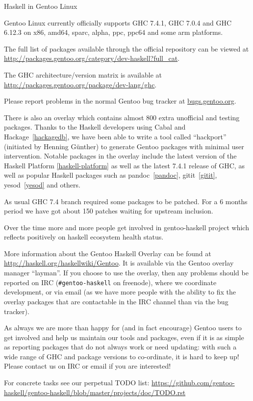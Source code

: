 \begin{hcarentry}[updated]{Haskell in Gentoo Linux}
\label{gentoo}
\makeheader

Gentoo Linux currently officially supports GHC 7.4.1, GHC 7.0.4 and GHC 6.12.3
on x86, amd64, sparc, alpha, ppc, ppc64 and some arm platforms.

The full list of packages available through the official repository
can be viewed at
\url{http://packages.gentoo.org/category/dev-haskell?full\_cat}.

The GHC architecture/version matrix is available at
\url{http://packages.gentoo.org/package/dev-lang/ghc}.

Please report problems in the normal Gentoo bug tracker
at \url{bugs.gentoo.org}.

There is also an overlay which contains almost 800 extra unofficial
and testing packages. Thanks to the Haskell developers using Cabal and
Hackage~\cref{hackagedb}, we have been able to write a tool called
``hackport'' (initiated by Henning G\"unther) to generate Gentoo
packages with minimal user intervention. Notable packages in the
overlay include the latest version of the Haskell Platform \cref{haskell-platform} as well as
the latest 7.4.1 release of GHC, as well as popular Haskell packages
such as pandoc~\cref{pandoc}, gitit~\cref{gitit}, yesod~\cref{yesod} and others.

As usual GHC 7.4 branch required some packages to be patched. For a 6
months period we have got about 150 patches waiting for upstream inclusion.

Over the time more and more people get involved in gentoo-haskell project
which reflects positively on haskell ecosystem health status.

More information about the Gentoo Haskell Overlay can be found at
\url{http://haskell.org/haskellwiki/Gentoo}. It is available via the Gentoo
overlay manager ``layman''.  If you choose to use the overlay, then
any problems should be reported on IRC (\verb+#gentoo-haskell+ on
freenode), where we coordinate development, or via email
 (as we have more people with the ability to
fix the overlay packages that are contactable in the IRC channel than
via the bug tracker).

As always we are more than happy for (and in fact encourage) Gentoo
users to get involved and help us maintain our tools and packages,
even if it is as simple as reporting packages that do not always work
or need updating: with such a wide range of GHC and package versions
to co-ordinate, it is hard to keep up!  Please contact us on IRC or
email if you are interested!

For concrete tasks see our perpetual TODO list:
\url{https://github.com/gentoo-haskell/gentoo-haskell/blob/master/projects/doc/TODO.rst}
\end{hcarentry}

